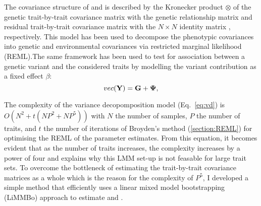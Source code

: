 The covariance structure of  and \tmat{\Psi} is described by the Kronecker product $\otimes$ of the genetic trait-by-trait covariance matrix  with the genetic relationship matrix  and residual trait-by-trait covariance matrix  with the \(N \times N\) identity matrix , respectively.
This model has been used to decompose the phenotypic covariances into genetic and environmental covariances via restricted marginal likelihood (REML).The same framework has been used to test for association between a genetic variant and the considered traits by modelling the variant contribution as a fixed effect \(\beta\): 
\begin{equation}
vec(\boldsymbol{\mathbf{Y}}) =  \boldsymbol{\mathbf{G}} + \boldsymbol{\mathbf{\Psi}},
\end{equation}

The complexity of the variance decopomposition model (Eq.~\ref{eq:vd}) is \(O(N^2 + t(NP^2 + NP^5))\) with \(N\) the number of samples, \(P\) the number of traits, and \(t\) the number of iterations of Broyden's method (\cref{section:REML}) for optimising the REML of the parameter estimates. From this equation, it becomes evident that as the number of traits increases, the complexity increases by a power of four and explains why this LMM set-up is not feasable for large trait sets. To overcome the bottleneck of estimating the trait-by-trait covariance matrices as a whole which is the reason for the complexity of \(P^5\), I developed a simple method that efficiently uses a linear mixed model bootstrapping (LiMMBo) approach to estimate  and .